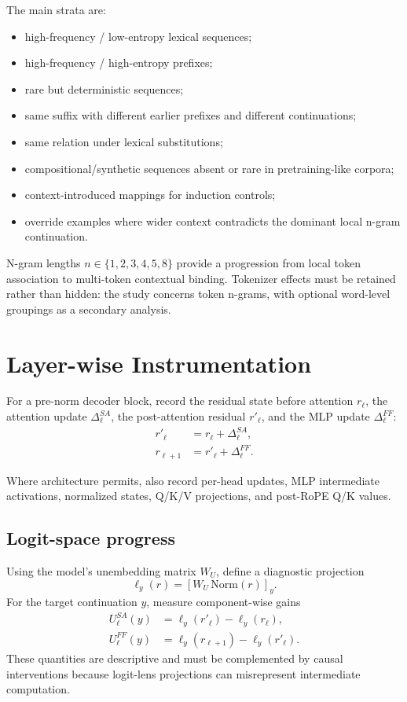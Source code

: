 \documentclass[10pt]{article}
\begin{document}
The main strata are:
\begin{itemize}
    \item high-frequency / low-entropy lexical sequences;
    \item high-frequency / high-entropy prefixes;
    \item rare but deterministic sequences;
    \item same suffix with different earlier prefixes and different continuations;
    \item same relation under lexical substitutions;
    \item compositional/synthetic sequences absent or rare in pretraining-like corpora;
    \item context-introduced mappings for induction controls;
    \item override examples where wider context contradicts the dominant local n-gram continuation.
\end{itemize}

N-gram lengths $n\in\{1,2,3,4,5,8\}$ provide a progression from local token association to multi-token contextual binding. Tokenizer effects must be retained rather than hidden: the study concerns token n-grams, with optional word-level groupings as a secondary analysis.

\section{Layer-wise Instrumentation}
For a pre-norm decoder block, record the residual state before attention $r_\ell$, the attention update $\Delta^{SA}_\ell$, the post-attention residual $r'_\ell$, and the MLP update $\Delta^{FF}_\ell$:
\begin{align}
 r'_\ell &= r_\ell + \Delta^{SA}_\ell,\\
 r_{\ell+1} &= r'_\ell + \Delta^{FF}_\ell.
\end{align}

Where architecture permits, also record per-head updates, MLP intermediate activations, normalized states, Q/K/V projections, and post-RoPE Q/K values.

\subsection{Logit-space progress}
Using the model's unembedding matrix $W_U$, define a diagnostic projection
\begin{equation}
 \ell_y(r)= [W_U\,\mathrm{Norm}(r)]_y.
\end{equation}
For the target continuation $y$, measure component-wise gains
\begin{align}
 U^{SA}_\ell(y) &= \ell_y(r'_\ell)-\ell_y(r_\ell),\\
 U^{FF}_\ell(y) &= \ell_y(r_{\ell+1})-\ell_y(r'_\ell).
\end{align}
These quantities are descriptive and must be complemented by causal interventions because logit-lens projections can misrepresent intermediate computation.
\end{document}
